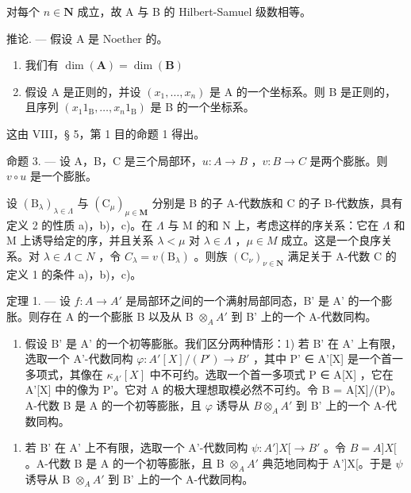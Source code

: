 对每个 \(n \in \mathbf{N}\) 成立，故 A 与 B 的 Hilbert-Samuel 级数相等。

推论. --- 假设 A 是 Noether 的。

\begin{enumerate}
\def\labelenumi{\alph{enumi})}
\item
  我们有 \(\dim (\mathbf{A}) = \dim (\mathbf{B})\)
\item
  假设 A 是正则的，并设 \((x_{1},\ldots ,x_{n})\) 是 A 的一个坐标系。则 B 是正则的，且序列 \((x_{1}1_{\mathrm{B}},\dots,x_{n}1_{\mathrm{B}})\) 是 B 的一个坐标系。
\end{enumerate}

这由 VIII，§ 5，第 1 目的命题 1 得出。

命题 3. --- 设 A，B，C 是三个局部环，\(u:A\to B\) ，\(v:B\to C\) 是两个膨胀。则 \(v\circ u\) 是一个膨胀。

设 \((\mathrm{B}_{\lambda})_{\lambda\in\Lambda}\) 与 \((\mathrm{C}_{\mu})_{\mu\in\mathbf{M}}\) 分别是 B 的子 A-代数族和 C 的子 B-代数族，具有定义 2 的性质 a)，b)，c)。在 \(\Lambda\) 与 M 的和 N 上，考虑这样的序关系：它在 \(\Lambda\) 和 M 上诱导给定的序，并且关系 \(\lambda<\mu\) 对 \(\lambda\in\Lambda\) ，\(\mu\in M\) 成立。这是一个良序关系。对 \(\lambda\in\Lambda\subset N\) ，令 \(C_{\lambda}=v(\mathrm{B}_{\lambda})\) 。则族 \((\mathrm{C}_{\nu})_{\nu\in\mathbf{N}}\) 满足关于 A-代数 C 的定义 1 的条件 a)，b)，c)。

定理 1. --- 设 \(f:A\to A'\) 是局部环之间的一个满射局部同态，B' 是 A' 的一个膨胀。则存在 A 的一个膨胀 B 以及从 B \(\otimes_{A}A'\) 到 B' 上的一个 A-代数同构。

\begin{enumerate}
\def\labelenumi{\Alph{enumi})}
\tightlist
\item
  假设 B' 是 A' 的一个初等膨胀。我们区分两种情形：1) 若 B' 在 A' 上有限，选取一个 A'-代数同构 \(\varphi: A'[X]/(P') \to B'\) ，其中 P' ∈ A'{[}X{]} 是一个首一多项式，其像在 \(\kappa_{A'}[X]\) 中不可约。选取一个首一多项式 P ∈ A{[}X{]} ，它在 A'{[}X{]} 中的像为 P'。它对 A 的极大理想取模必然不可约。令 B = A{[}X{]}/(P)。A-代数 B 是 A 的一个初等膨胀，且 \(\varphi\) 诱导从 \(B \otimes_{A} A'\) 到 B' 上的一个 A-代数同构。
\end{enumerate}

\begin{enumerate}
\def\labelenumi{\arabic{enumi})}
\setcounter{enumi}{1}
\tightlist
\item
  若 B' 在 A' 上不有限，选取一个 A'-代数同构 \(\psi : A']X[\to B'\) 。令 \(B = A]X[\) 。A-代数 B 是 A 的一个初等膨胀，且 B \(\otimes_{A} A'\) 典范地同构于 A'{]}X{[}。于是 \(\psi\) 诱导从 B \(\otimes_{A} A'\) 到 B' 上的一个 A-代数同构。
\end{enumerate}


